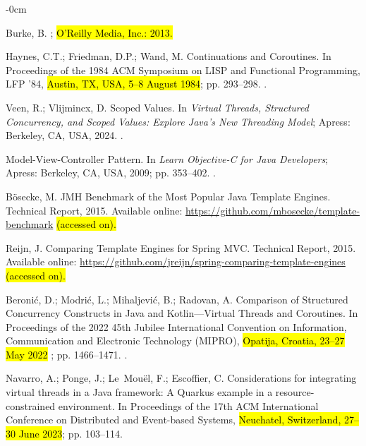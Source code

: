 \documentclass[software,article,accept,pdftex,moreauthors]{Definitions/mdpi}
\begin{document}
\begin{adjustwidth}{-\extralength}{0cm}
\begin{thebibliography}{999}
Burke, B.
; \hl{O'Reilly Media, Inc.: 2013.} %


Haynes, C.T.; Friedman, D.P.; Wand, M.
\newblock Continuations and Coroutines.
\newblock In Proceedings of the 1984 ACM Symposium on LISP
  and Functional Programming, LFP '84, \hl{Austin, TX, USA, 5--8 August 1984}; pp. 293–298.
.

Veen, R.; Vlijmincx, D. Scoped Values.
\newblock In {\em Virtual Threads, Structured Concurrency, and Scoped Values:
  Explore Java's New Threading Model}; Apress: Berkeley, CA, USA, 2024.
.

Model-View-Controller Pattern.
\newblock In {\em Learn Objective-C for Java Developers}; Apress: Berkeley, CA, USA, 
   2009; pp. 353--402.
.

Bösecke, M.
\newblock JMH Benchmark of the Most Popular Java Template Engines.
\newblock Technical Report, 2015.
  Available online: \url{https://github.com/mbosecke/template-benchmark} \hl{(accessed on).}


Reijn, J.
\newblock Comparing Template Engines for Spring MVC.
\newblock Technical Report, 2015.
 Available online: \url{https://github.com/jreijn/spring-comparing-template-engines} \hl{(accessed on).}

Beronić, D.; Modrić, L.; Mihaljević, B.; Radovan, A.
\newblock Comparison of Structured Concurrency Constructs in Java and Kotlin---Virtual Threads and Coroutines.
\newblock In Proceedings of the 2022 45th Jubilee International Convention on
  Information, Communication and Electronic Technology (MIPRO), \hl{Opatija, Croatia, 23--27 May 2022}%
; pp. 1466--1471.
.

Navarro, A.; Ponge, J.; Le~Mou{\"e}l, F.; Escoffier, C.
\newblock Considerations for integrating virtual threads in a Java framework: A
  Quarkus example in a resource-constrained environment.
\newblock In Proceedings of the 17th ACM International
  Conference on Distributed and Event-based Systems, \hl{Neuchatel, Switzerland, 27--30 June 2023}; pp. 103--114.


\end{thebibliography}
\end{adjustwidth}
\end{document}
